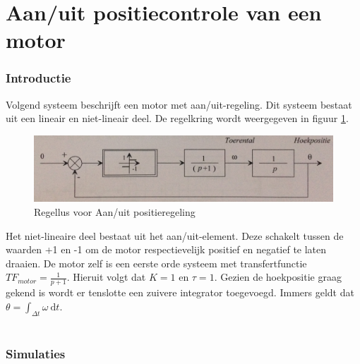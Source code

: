 \documentclass[12pt]{article}
\begin{document}
\part{Aan/uit positiecontrole van een motor}
\section{Introductie}
Volgend systeem beschrijft een motor met aan/uit-regeling. Dit systeem bestaat uit een lineair en niet-lineair deel. De regelkring wordt weergegeven in figuur \ref{regellus}.
\begin{figure}[!h]
	\centering
	\includegraphics[width=\textwidth, keepaspectratio]{regellus.png}
	\caption{Regellus voor Aan/uit positieregeling}
	\label{regellus}	
\end{figure}
\noindent
Het niet-lineaire deel bestaat uit het aan/uit-element. Deze schakelt tussen de waarden +1 en -1 om de motor respectievelijk positief en negatief te laten draaien. De motor zelf is een eerste orde systeem met transfertfunctie $TF_{motor} = \frac{1}{p+1}$. Hieruit volgt dat $K=1$ en $\tau=1$. Gezien de hoekpositie graag gekend is wordt er tenslotte een zuivere integrator toegevoegd. Immers geldt dat $\theta = \int_{\Delta t} \omega \ \mathrm{d}t$. \\ \\
\section{Simulaties}
\end{document}
